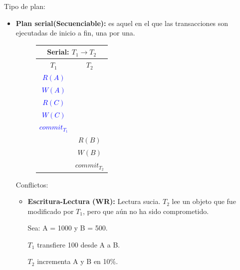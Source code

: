 \documentclass{templateNote}
\begin{document}
\begin{itemize}
    Tipo de plan:
    \begin{itemize}
        \item \textbf{Plan serial(Secuenciable):} es aquel en el que las transacciones son ejecutadas de inicio a fin, una por una.
        \begin{figure}[H]
            \centering
            \begin{tabular}{|c|c|}
                \hline
                \multicolumn{2}{|c|}{\textbf{Serial: $T_1 \rightarrow T_2$}} \\ \hline
                \textbf{$T_1$} & \textbf{$T_2$} \\ \hline
                \textcolor{blue}{$R(A)$} & \\
                \textcolor{blue}{$W(A)$} & \\
                \textcolor{blue}{$R(C)$} & \\
                \textcolor{blue}{$W(C)$} & \\
                \textcolor{blue}{\textit{$commit_{T_1}$}} & \\ \hline
                & \textcolor{green!80!black}{$R(B)$} \\
                & \textcolor{green!80!black}{$W(B)$} \\
                & \textcolor{green!80!black}{\textit{$commit_{T_2}$}} \\ \hline
            \end{tabular}
        \end{figure}

        \newpage
        Conflictos:
        \begin{itemize}
            \item \textbf{Escritura-Lectura (WR):} Lectura sucia. $T_2$ lee un objeto que fue modificado por $T_1$, pero que aún no ha sido comprometido.
            
            Sea: A = 1000 y B = 500.
            
            \subitem $T_1$ transfiere 100 desde A a B.
            
            \subitem $T_2$ incrementa A y B en 10\%.


\end{itemize}
\end{itemize}
\end{itemize}
\end{document}
